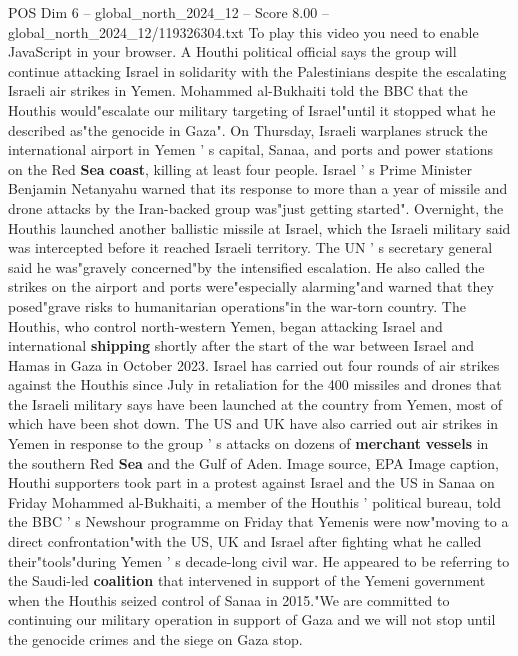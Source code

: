 \begin{textsample}{POS Dim 6 – global\_north\_2024\_12 – Score 8.00 – global\_north\_2024\_12/119326304.txt}  \label{ex:f6_pos_261}
To play this video you need to enable JavaScript in your browser.
A Houthi political official says the group will continue attacking Israel in solidarity with the Palestinians despite the escalating Israeli air strikes in Yemen.
Mohammed al-Bukhaiti told the BBC that the Houthis would"escalate our military targeting of Israel"until it stopped what he described as"the genocide in Gaza".
On Thursday, Israeli warplanes struck the international airport in Yemen ' s capital, Sanaa, and ports and power stations on the Red \textbf{Sea} \textbf{coast}, killing at least four people.
Israel ' s Prime Minister Benjamin Netanyahu warned that its response to more than a year of missile and drone attacks by the Iran-backed group was"just getting started".
Overnight, the Houthis launched another ballistic missile at Israel, which the Israeli military said was intercepted before it reached Israeli territory.
The UN ' s secretary general said he was"gravely concerned"by the intensified escalation.
He also called the strikes on the airport and ports were"especially alarming"and warned that they posed"grave risks to humanitarian operations"in the war-torn country.
The Houthis, who control north-western Yemen, began attacking Israel and international \textbf{shipping} shortly after the start of the war between Israel and Hamas in Gaza in October 2023.
Israel has carried out four rounds of air strikes against the Houthis since July in retaliation for the 400 missiles and drones that the Israeli military says have been launched at the country from Yemen, most of which have been shot down.
The US and UK have also carried out air strikes in Yemen in response to the group ' s attacks on dozens of \textbf{merchant} \textbf{vessels} in the southern Red \textbf{Sea} and the Gulf of Aden.
Image source, EPA Image caption, Houthi supporters took part in a protest against Israel and the US in Sanaa on Friday Mohammed al-Bukhaiti, a member of the Houthis ' political bureau, told the BBC ' s Newshour programme on Friday that Yemenis were now"moving to a direct confrontation"with the US, UK and Israel after fighting what he called their"tools"during Yemen ' s decade-long civil war.
He appeared to be referring to the Saudi-led \textbf{coalition} that intervened in support of the Yemeni government when the Houthis seized control of Sanaa in 2015."We are committed to continuing our military operation in support of Gaza and we will not stop until the genocide crimes and the siege on Gaza stop.

\end{textsample}
